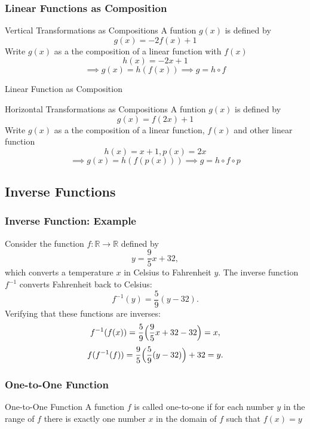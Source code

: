 \begin{frame}
  \frametitle{Linear Functions as Composition}
  \begin{exampleblock}{Vertical Transformations as Compositions}
    A funtion \(g(x)\) is defined by 
    \[g(x)= -2f(x)+1\] 
    Write \(g(x)\) as a the composition of a linear function with \(f(x)\) 
    \[h(x) = -2x + 1 \]
    \[\implies g(x) = h(f(x)) \implies g = h \circ f \]
   \end{exampleblock}
  \end{frame}
  \begin{frame}{Linear Function as Composition}
   \begin{exampleblock}{Horizontal Transformations as Compositions}
    A funtion \(g(x)\) is defined by 
    \[g(x)= f(2x)+1\] 
    Write \(g(x)\) as a the composition of a linear function,  \(f(x)\) and other linear function 
    \[h(x) = x + 1, p(x) = 2x \]
    \[\implies g(x) = h(f(p(x))) \implies g = h \circ f \circ p \]
   \end{exampleblock}
\end{frame}
\subsection{Inverse Functions}
  \begin{frame}
    \frametitle{Inverse Function: Example}
      Consider the function \( f: \mathbb{R} \to \mathbb{R} \) defined by
      \[
      y = \frac{9}{5}x + 32,
      \]
      which converts a temperature \( x \) in Celsius to Fahrenheit \( y \).
      The inverse function \( f^{-1} \) converts Fahrenheit back to Celsius:
      \[
      f^{-1}(y) = \frac{5}{9}(y - 32).
      \]
      Verifying that these functions are inverses:
      \[
      f^{-1}(f(x)) = \frac{5}{9}\Bigl(\frac{9}{5}x + 32 - 32\Bigr) = x,
      \]
      \[
      f(f^{-1}(f)) = \frac{9}{5}\Bigl(\frac{5}{9}(y - 32)\Bigr) + 32 = y.
      \]
  \end{frame}
\begin{frame}
  \frametitle{One-to-One Function}
  \begin{block}{One-to-One Function}
    A function \(f\) is called one-to-one if for each number \(y\) in the range of \(f\) there is
  exactly one number \(x\) in the domain of \(f\) such that \(f (x) = y\)
  \end{block}
\end{frame}

